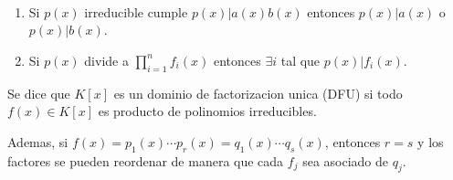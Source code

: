 \begin{proposition}
	~\begin{enumerate}
		\item Si \(p(x )\) irreducible cumple \(p(x) | a(x) b(x )\) entonces \(p(x) | a(x )\) o \(p(x) | b(x )\).
		\item Si \(p(x )\) divide a \(\prod\limits_{i =1}^{n} f_i (x) \) entonces \(\exists i \) tal que \(p(x) | f_i (x )\).
	\end{enumerate}
\end{proposition}
\begin{theorem}
	Se dice que \(K[x]\) es un dominio de factorizacion unica (DFU) si todo \(f(x) \in K[x ]\) es producto de polinomios irreducibles.
	
	Ademas, si \(f(x) = p_1 (x) \cdots p_r (x) = q_1(x) \cdots q_s (x )\), entonces \(r = s \) y los factores se pueden reordenar de manera que cada \(f_j \) sea asociado de \(q_j \).
\end{theorem}

